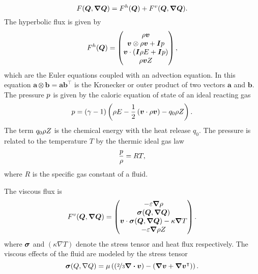 \begin{equation}
  \label{eq:flux}
  \flux(\Q, \gradQ) = \hyperFlux(\Q) + \viscFlux(\Q, \gradQ).
\end{equation}
The hyperbolic flux is given by
\begin{equation}
  \label{eq:hyper-flux}
  F^{h}(\bm{Q}) = \begin{pmatrix} \rho \bm{v} \\ \bm{v} \otimes \rho \bm{v} + \bm{I} p \\ \bm{v} \cdot (\bm{I} \rho E + \bm{I} p) \\ \rho \bm{v} Z \end{pmatrix},
\end{equation}
which are the Euler equations coupled with an advection equation.
In this equation $\bm{a} \otimes \bm{b} = \bm{a} \bm{b}^\intercal$ is the Kronecker or outer product of two vectors $\bm{a}$ and $\bm{b}$.
The pressure $p$ is given by the caloric equation of state of an ideal reacting gas
\begin{equation}
  \label{eq:eos}
  p = (\gamma - 1) \left(\rho E - \frac{1}{2} \left(\bm{v} \cdot \rho \bm{v} \right)  - q_0 \rho Z \right).
\end{equation}
The term $q_0 \rho Z$ is the chemical energy with the heat release $q_0$.
The pressure is related to the temperature $T$ by the thermic ideal gas law
\begin{equation}
  \label{eq:temperature}
 \frac{p}{\rho} = RT,
\end{equation}
where $R$ is the specific gas constant of a fluid.

The viscous flux is
\begin{equation}
  \label{eq:visc-flux}
  \viscFlux(\Q, \gradQ) = \viscFluxDef.
\end{equation}
where $\bm{\sigma}$ and $(\kappa \nabla T)$ denote the stress tensor and heat flux respectively.
The viscous effects of the fluid are modeled by the stress tensor
\begin{equation}
  \label{eq:stress-tensor}
  \stressT(Q, \nabla Q) =
  \mu
  \left(
  \left(\nicefrac{2}{3} \divergence{\Qv} \right) -
  \left( \gradient{\Qv} + \gradient{\Qv}^\intercal \right)
  \right).
\end{equation}

